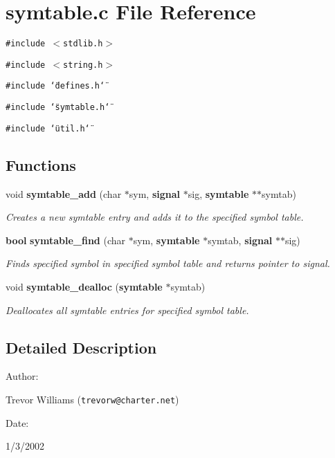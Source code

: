\section{symtable.c File Reference}
\label{symtable_8c}
{\tt \#include $<$stdlib.h$>$}\par
{\tt \#include $<$string.h$>$}\par
{\tt \#include \char`\"{}defines.h\char`\"{}}\par
{\tt \#include \char`\"{}symtable.h\char`\"{}}\par
{\tt \#include \char`\"{}util.h\char`\"{}}\par
\subsection*{Functions}
\begin{CompactItemize}
\item 
void {\bf symtable\_\-add} (char $\ast$sym, {\bf signal} $\ast$sig, {\bf symtable} $\ast$$\ast$symtab)
\begin{CompactList}\small\item\em Creates a new symtable entry and adds it to the specified symbol table.\item\end{CompactList}\item 
{\bf bool} {\bf symtable\_\-find} (char $\ast$sym, {\bf symtable} $\ast$symtab, {\bf signal} $\ast$$\ast$sig)
\begin{CompactList}\small\item\em Finds specified symbol in specified symbol table and returns pointer to signal.\item\end{CompactList}\item 
void {\bf symtable\_\-dealloc} ({\bf symtable} $\ast$symtab)
\begin{CompactList}\small\item\em Deallocates all symtable entries for specified symbol table.\item\end{CompactList}\end{CompactItemize}


\subsection{Detailed Description}


\begin{Desc}
\item[Author: ]\par
Trevor Williams ({\tt trevorw@charter.net}) \end{Desc}
\begin{Desc}
\item[Date: ]\par
1/3/2002\end{Desc}


